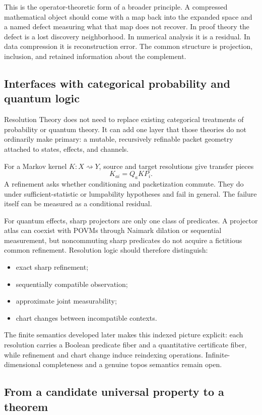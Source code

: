 \documentclass[11pt]{article}
\theoremstyle{definition}
\theoremstyle{remark}
\begin{document}
This is the operator-theoretic form of a broader principle.  A compressed mathematical object should come with a map back into the expanded space and a named defect measuring what that map does not recover.  In proof theory the defect is a lost discovery neighborhood.  In numerical analysis it is a residual.  In data compression it is reconstruction error.  The common structure is projection, inclusion, and retained information about the complement.

\subsection{Interfaces with categorical probability and quantum logic}

Resolution Theory does not need to replace existing categorical treatments of probability or quantum theory.  It can add one layer that those theories do not ordinarily make primary: a mutable, recursively refinable packet geometry attached to states, effects, and channels.

For a Markov kernel $K:X\rightsquigarrow Y$, source and target resolutions give transfer pieces
\[
 K_{ai}=Q_aKP_i.
\]
A refinement asks whether conditioning and packetization commute.  They do under sufficient-statistic or lumpability hypotheses and fail in general.  The failure itself can be measured as a conditional residual.

For quantum effects, sharp projectors are only one class of predicates.  A projector atlas can coexist with POVMs through Naimark dilation or sequential measurement, but noncommuting sharp predicates do not acquire a fictitious common refinement.  Resolution logic should therefore distinguish:
\begin{itemize}
\item exact sharp refinement;
\item sequentially compatible observation;
\item approximate joint measurability;
\item chart changes between incompatible contexts.
\end{itemize}

The finite semantics developed later makes this indexed picture explicit: each resolution carries a Boolean predicate fiber and a quantitative certificate fiber, while refinement and chart change induce reindexing operations.  Infinite-dimensional completeness and a genuine topos semantics remain open.

\subsection{From a candidate universal property to a theorem}
\end{document}
